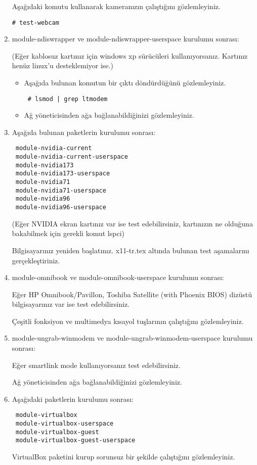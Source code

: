 \documentclass[a4paper,10pt]{article}
\begin{document}
\begin{enumerate}
Aşağıdaki komutu kullanarak kameranızın çalıştığını gözlemleyiniz.
\begin{verbatim}
# test-webcam
\end{verbatim}

\item module-ndiswrapper ve module-ndiswrapper-userspace kurulumu sonrası:

(Eğer kablosuz kartınız için windows xp sürücüleri kullanıyorsanız. Kartınız henüz linux'u desteklemiyor ise.)

\begin{itemize}
 \item Aşağıda bulunan komutun bir çıktı döndürdüğünü gözlemleyiniz.
 \begin{verbatim}
 # lsmod | grep ltmodem
 \end{verbatim}
\item Ağ yöneticisinden ağa bağlanabildiğinizi gözlemleyiniz.
\end{itemize}

\item Aşağıda bulunan paketlerin kurulumu sonrası:
 \begin{verbatim}
 module-nvidia-current
 module-nvidia-current-userspace
 module-nvidia173
 module-nvidia173-userspace
 module-nvidia71
 module-nvidia71-userspace
 module-nvidia96
 module-nvidia96-userspace
\end{verbatim}
(Eğer NVIDIA ekran kartınız var ise test edebilirsiniz, kartınızın ne olduğuna bakabilmek için gerekli komut lspci)

Bilgisayarınız yeniden başlatınız. x11-tr.tex altında bulunan test aşamalarını gerçekleştiriniz.

\item module-omnibook ve module-omnibook-userspace  kurulumu sonrası: 

Eğer HP Omnibook/Pavillon, Toshiba Satellite (with Phoenix BIOS) dizüstü bilgisayarınız var ise test edebilirsiniz. 

Çeşitli fonksiyon ve multimedya kısayol tuşlarının çalıştığını gözlemleyiniz.

\item module-ungrab-winmodem ve module-ungrab-winmodem-userspace kurulumu sonrası: 

Eğer smartlink mode kullanıyorsanız test edebilirsiniz.

Ağ yöneticisinden ağa bağlanabildiğinizi gözlemleyiniz.

\item  Aşağıdaki paketlerin kurulumu sonrası: 
\begin{verbatim}
 module-virtualbox
 module-virtualbox-userspace
 module-virtualbox-guest
 module-virtualbox-guest-userspace
\end{verbatim}

VirtualBox paketini kurup sorunsuz bir şekilde çalıştığını gözlemleyiniz.

\end{enumerate}
\end{document}
